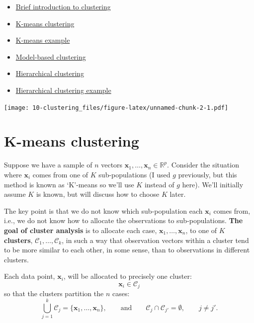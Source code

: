 \documentclass[
]{book}
\providecommand{\tightlist}{%
  \setlength{\itemsep}{0pt}\setlength{\parskip}{0pt}}
\theoremstyle{definition}
\theoremstyle{definition}
\theoremstyle{definition}
\theoremstyle{definition}
\theoremstyle{remark}
\begin{document}
\begin{itemize}
\tightlist
\item
  \href{https://mediaspace.nottingham.ac.uk/media/ClusteringA+Introduction/1_771r59k0}{Brief introduction to clustering}
\item
  \href{https://mediaspace.nottingham.ac.uk/media/ClusteringA+K-means+clustering/1_vqjrjyey}{K-means clustering}
\item
  \href{https://mediaspace.nottingham.ac.uk/media/ClusteringA+K-means+example/1_6fhpxnii}{K-means example}
\item
  \href{https://mediaspace.nottingham.ac.uk/media/ClusteringA+Model-based+clustering/1_89rjovbp}{Model-based clustering}
\item
  \href{https://mediaspace.nottingham.ac.uk/media/ClusteringA+Hierarchical+methods/1_ngog5anc}{Hierarchical clustering}
\item
  \href{https://mediaspace.nottingham.ac.uk/media/ClusteringA+Hierarchical+example/1_kuzx1iy6}{Hierarchical clustering example}
\end{itemize}

\texttt{[image: 10-clustering\_files/figure-latex/unnamed-chunk-2-1.pdf]}

\hypertarget{k-means-clustering}{%
\section{K-means clustering}\label{k-means-clustering}}

Suppose we have a sample of \(n\) vectors \(\mathbf x_1, \ldots , \mathbf x_n \in \mathbb{R}^p\). Consider the situation where \(\mathbf x_i\) comes from one of \(K\) sub-populations (I used \(g\) previously, but this method is known as `K'-means so we'll use \(K\) instead of \(g\) here). We'll initially assume \(K\) is known, but will discuss how to choose \(K\) later.

The key point is that we do not know which sub-population each \(\mathbf x_i\) comes from, i.e., we do not know how to allocate the observations to sub-populations. \textbf{The goal of cluster analysis} is to allocate each case, \(\mathbf x_1, \ldots, \mathbf x_n\), to one of \(K\) \textbf{clusters}, \(\mathcal{C}_1, \ldots , \mathcal{C}_k\), in such a way that observation vectors within a cluster tend to be more similar to each other, in some sense, than to observations in different clusters.

Each data point, \(\mathbf x_i\), will be allocated to precisely one cluster:
\[\mathbf x_i \in \mathcal{C}_j\]
so that the clusters partition the \(n\) cases:
\[
\bigcup_{j=1}^k \mathcal{C}_j = \{\mathbf x_1, \ldots , \mathbf x_n\}, \qquad \text{and} \qquad \mathcal{C}_j \cap \mathcal{C}_{j'} =\emptyset,\qquad j \neq j'.
\]
\end{document}

